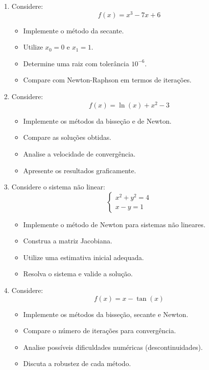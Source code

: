 \begin{enumerate}
\item Considere:
\[
f(x) = x^3 - 7x + 6
\]

\begin{itemize}
    \item Implemente o método da secante.
    \item Utilize $x_0 = 0$ e $x_1 = 1$.
    \item Determine uma raiz com tolerância $10^{-6}$.
    \item Compare com Newton-Raphson em termos de iterações.
\end{itemize}

\item Considere:
\[
f(x) = \ln(x) + x^2 - 3
\]

\begin{itemize}
    \item Implemente os métodos da bisseção e de Newton.
    \item Compare as soluções obtidas.
    \item Analise a velocidade de convergência.
    \item Apresente os resultados graficamente.
\end{itemize}

\item Considere o sistema não linear:
\[
\begin{cases}
x^2 + y^2 = 4 \\
x - y = 1
\end{cases}
\]

\begin{itemize}
    \item Implemente o método de Newton para sistemas não lineares.
    \item Construa a matriz Jacobiana.
    \item Utilize uma estimativa inicial adequada.
    \item Resolva o sistema e valide a solução.
\end{itemize}

\item Considere:
\[
f(x) = x - \tan(x)
\]

\begin{itemize}
    \item Implemente os métodos da bisseção, secante e Newton.
    \item Compare o número de iterações para convergência.
    \item Analise possíveis dificuldades numéricas (descontinuidades).
    \item Discuta a robustez de cada método.
\end{itemize}

\end{enumerate}